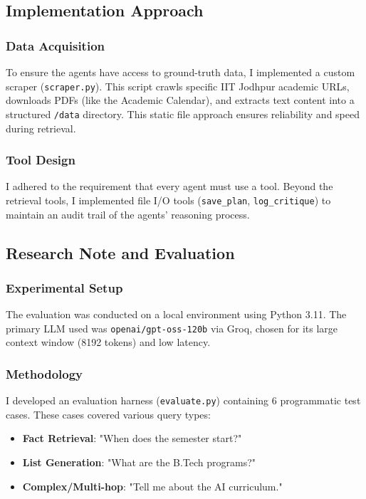 \subsection{Implementation Approach}

\subsubsection{Data Acquisition}
To ensure the agents have access to ground-truth data, I implemented a custom scraper (\texttt{scraper.py}). This script crawls specific IIT Jodhpur academic URLs, downloads PDFs (like the Academic Calendar), and extracts text content into a structured \texttt{/data} directory. This static file approach ensures reliability and speed during retrieval.

\subsubsection{Tool Design}
I adhered to the requirement that every agent must use a tool. Beyond the retrieval tools, I implemented file I/O tools (\texttt{save\_plan}, \texttt{log\_critique}) to maintain an audit trail of the agents' reasoning process.

\subsection{Research Note and Evaluation}

\subsubsection{Experimental Setup}
The evaluation was conducted on a local environment using Python 3.11. The primary LLM used was \texttt{openai/gpt-oss-120b} via Groq, chosen for its large context window (8192 tokens) and low latency.

\subsubsection{Methodology}
I developed an evaluation harness (\texttt{evaluate.py}) containing 6 programmatic test cases. These cases covered various query types:
\begin{itemize}
    \item \textbf{Fact Retrieval}: "When does the semester start?"
    \item \textbf{List Generation}: "What are the B.Tech programs?"
    \item \textbf{Complex/Multi-hop}: "Tell me about the AI curriculum."
\end{itemize}

